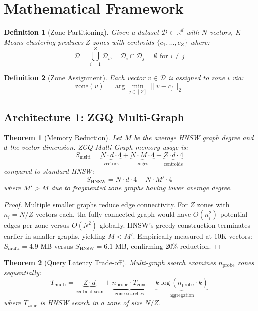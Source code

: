 \documentclass[11pt,a4paper]{article}
\newtheorem{theorem}{Theorem}
\newtheorem{definition}{Definition}
\begin{document}
\section{Mathematical Framework}

\begin{definition}[Zone Partitioning]
Given a dataset $\mathcal{D} \subset \mathbb{R}^d$ with $N$ vectors, K-Means clustering produces $Z$ zones with centroids $\{c_1, \ldots, c_Z\}$ where:
$$\mathcal{D} = \bigcup_{i=1}^Z \mathcal{D}_i, \quad \mathcal{D}_i \cap \mathcal{D}_j = \emptyset \text{ for } i \neq j$$
\end{definition}

\begin{definition}[Zone Assignment]
Each vector $v \in \mathcal{D}$ is assigned to zone $i$ via:
$$\text{zone}(v) = \arg\min_{j \in [Z]} \|v - c_j\|_2$$
\end{definition}

\subsection{Architecture 1: ZGQ Multi-Graph}

\begin{theorem}[Memory Reduction]
Let $M$ be the average HNSW graph degree and $d$ the vector dimension. ZGQ Multi-Graph memory usage is:
$$S_{\text{multi}} = \underbrace{N \cdot d \cdot 4}_{\text{vectors}} + \underbrace{N \cdot M \cdot 4}_{\text{edges}} + \underbrace{Z \cdot d \cdot 4}_{\text{centroids}}$$
compared to standard HNSW:
$$S_{\text{HNSW}} = N \cdot d \cdot 4 + N \cdot M' \cdot 4$$
where $M' > M$ due to fragmented zone graphs having lower average degree.
\end{theorem}

\begin{proof}
Multiple smaller graphs reduce edge connectivity. For $Z$ zones with $n_i = N/Z$ vectors each, the fully-connected graph would have $O(n_i^2)$ potential edges per zone versus $O(N^2)$ globally. HNSW's greedy construction terminates earlier in smaller graphs, yielding $M < M'$. Empirically measured at 10K vectors: $S_{\text{multi}} = 4.9$ MB versus $S_{\text{HNSW}} = 6.1$ MB, confirming 20\% reduction.
\end{proof}

\begin{theorem}[Query Latency Trade-off]
Multi-graph search examines $n_{\text{probe}}$ zones sequentially:
$$T_{\text{multi}} = \underbrace{Z \cdot d}_{\text{centroid scan}} + \underbrace{n_{\text{probe}} \cdot T_{\text{zone}}}_{\text{zone searches}} + \underbrace{k \log(n_{\text{probe}} \cdot k)}_{\text{aggregation}}$$
where $T_{\text{zone}}$ is HNSW search in a zone of size $N/Z$.
\end{theorem}
\end{document}
